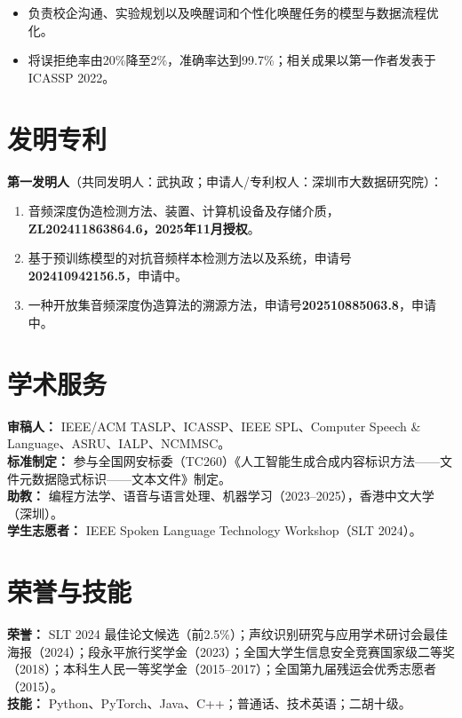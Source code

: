 \documentclass{resume}
\begin{document}
\begin{itemize}
  \item 负责校企沟通、实验规划以及唤醒词和个性化唤醒任务的模型与数据流程优化。
  \item 将误拒绝率由20\%降至2\%，准确率达到99.7\%；相关成果以第一作者发表于ICASSP 2022。
\end{itemize}

\section{发明专利}
\textbf{第一发明人}（共同发明人：武执政；申请人/专利权人：深圳市大数据研究院）：
\begin{enumerate}
  \item 音频深度伪造检测方法、装置、计算机设备及存储介质，\textbf{ZL202411863864.6，2025年11月授权}。
  \item 基于预训练模型的对抗音频样本检测方法以及系统，申请号\textbf{202410942156.5}，申请中。
  \item 一种开放集音频深度伪造算法的溯源方法，申请号\textbf{202510885063.8}，申请中。
\end{enumerate}

\section{学术服务}
\textbf{审稿人：} IEEE/ACM TASLP、ICASSP、IEEE SPL、Computer Speech \& Language、ASRU、IALP、NCMMSC。\\
\textbf{标准制定：} 参与全国网安标委（TC260）《人工智能生成合成内容标识方法——文件元数据隐式标识——文本文件》制定。\\
\textbf{助教：} 编程方法学、语音与语言处理、机器学习（2023--2025），香港中文大学（深圳）。\\
\textbf{学生志愿者：} IEEE Spoken Language Technology Workshop（SLT 2024）。

\section{荣誉与技能}
\textbf{荣誉：} SLT 2024 最佳论文候选（前2.5\%）；声纹识别研究与应用学术研讨会最佳海报（2024）；段永平旅行奖学金（2023）；全国大学生信息安全竞赛国家级二等奖（2018）；本科生人民一等奖学金（2015--2017）；全国第九届残运会优秀志愿者（2015）。\\
\textbf{技能：} Python、PyTorch、Java、C++；普通话、技术英语；二胡十级。
\end{document}
